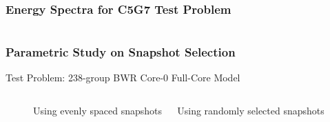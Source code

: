\documentclass[fleqn]{beamer}
\begin{document}
    \begin{frame}[noframenumbering]
      \frametitle{Energy Spectra for C5G7 Test Problem}
      \centering
      \begin{figure}
          \begin{columns}[T]
              \begin{column}{0.5\textwidth}
              \end{column}
          \end{columns}
      \end{figure}
  \end{frame}
  
  \begin{frame}[noframenumbering]
      \frametitle{Parametric Study on Snapshot Selection}
      \centering
      Test Problem: 238-group BWR Core-0 Full-Core Model
      \begin{figure}
          \begin{columns}[T]
              \begin{column}{0.5\linewidth}
                  Using evenly spaced snapshots
              \end{column}
              \begin{column}{0.5\linewidth}
                  Using randomly selected snapshots
              \end{column}
          \end{columns}
      \end{figure}
  \end{frame}
        
\end{document}
